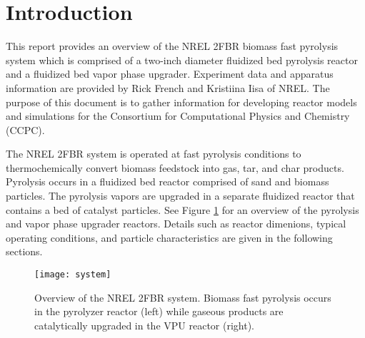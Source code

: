 
\section{Introduction}

This report provides an overview of the NREL 2FBR biomass fast pyrolysis system which is comprised of a two-inch diameter fluidized bed pyrolysis reactor and a fluidized bed vapor phase upgrader. Experiment data and apparatus information are provided by Rick French and Kristiina Iisa of NREL. The purpose of this document is to gather information for developing reactor models and simulations for the Consortium for Computational Physics and Chemistry (CCPC).

The NREL 2FBR system is operated at fast pyrolysis conditions to thermochemically convert biomass feedstock into gas, tar, and char products. Pyrolysis occurs in a fluidized bed reactor comprised of sand and biomass particles. The pyrolysis vapors are upgraded in a separate fluidized reactor that contains a bed of catalyst particles. See Figure \ref{fig:system} for an overview of the pyrolysis and vapor phase upgrader reactors. Details such as reactor dimenions, typical operating conditions, and particle characteristics are given in the following sections.

\begin{figure}[H]
    \centering
    \texttt{[image: system]}
    \caption{Overview of the NREL 2FBR system. Biomass fast pyrolysis occurs in the pyrolyzer reactor (left) while gaseous products are catalytically upgraded in the VPU reactor (right).}
    \label{fig:system}
\end{figure}
